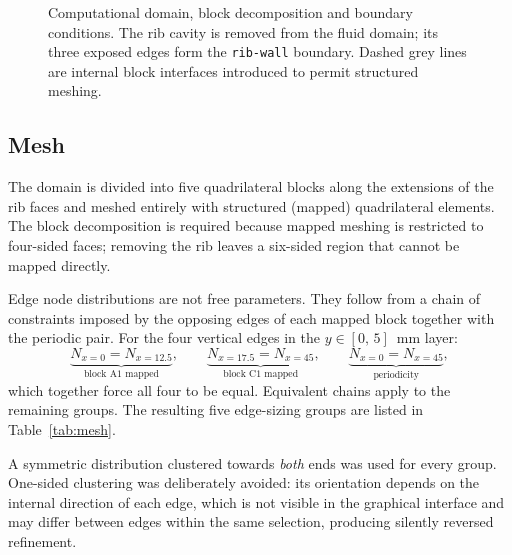\documentclass[11pt,a4paper]{article}
\begin{document}
\begin{figure}[htbp]
\caption{Computational domain, block decomposition and boundary conditions.
The rib cavity is removed from the fluid domain; its three exposed edges
form the \texttt{rib-wall} boundary. Dashed grey lines are internal block
interfaces introduced to permit structured meshing.}
\label{fig:domain}
\end{figure}

\subsection{Mesh}

The domain is divided into five quadrilateral blocks along the extensions
of the rib faces and meshed entirely with structured (mapped) quadrilateral
elements. The block decomposition is required because mapped meshing is
restricted to four-sided faces; removing the rib leaves a six-sided region
that cannot be mapped directly.

Edge node distributions are not free parameters. They follow from a chain
of constraints imposed by the opposing edges of each mapped block together
with the periodic pair. For the four vertical edges in the
$y \in [0,\,5]$~mm layer:
\begin{equation}
  \underbrace{N_{x=0} = N_{x=12.5}}_{\text{block A1 mapped}}, \qquad
  \underbrace{N_{x=17.5} = N_{x=45}}_{\text{block C1 mapped}}, \qquad
  \underbrace{N_{x=0} = N_{x=45}}_{\text{periodicity}},
\end{equation}
which together force all four to be equal. Equivalent chains apply to the
remaining groups. The resulting five edge-sizing groups are listed in
Table~\ref{tab:mesh}.

A symmetric distribution clustered towards \emph{both} ends was used for
every group. One-sided clustering was deliberately avoided: its orientation
depends on the internal direction of each edge, which is not visible in the
graphical interface and may differ between edges within the same selection,
producing silently reversed refinement.
\end{document}
